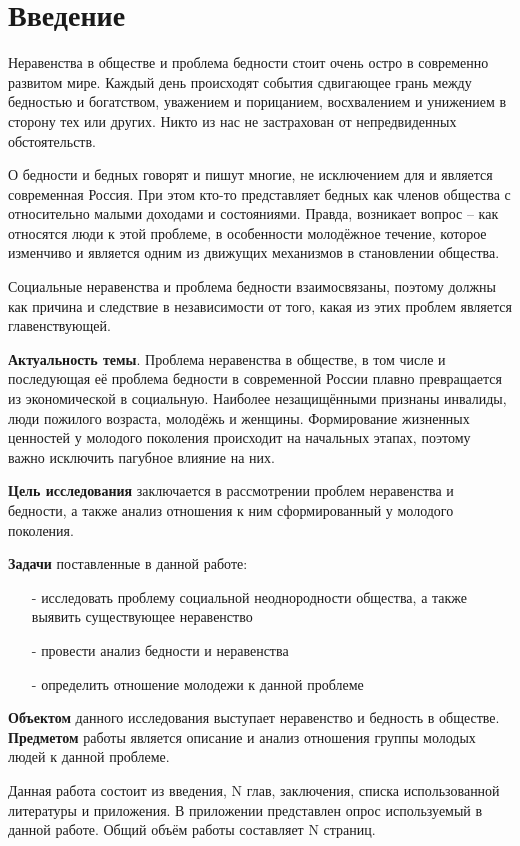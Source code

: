 \section*{Введение}

Неравенства в обществе и проблема бедности стоит очень остро в современно 
развитом мире. Каждый день происходят события сдвигающее грань между бедностью 
и богатством, уважением и порицанием, восхвалением и унижением в сторону тех 
или других. Никто из нас не застрахован от непредвиденных обстоятельств.

О бедности и бедных говорят и пишут многие, не исключением для и является 
современная Россия. При этом кто-то представляет бедных как членов общества с 
относительно малыми доходами и состояниями. Правда, возникает вопрос -- 
как относятся люди к этой проблеме, в особенности молодёжное течение, которое 
изменчиво и является одним из движущих механизмов в становлении общества.

Социальные неравенства и проблема бедности взаимосвязаны, поэтому должны как 
причина и следствие в независимости от того, какая из этих проблем является 
главенствующей.

\textbf{Актуальность темы}. Проблема неравенства в обществе, в том числе и 
последующая её проблема бедности в современной России плавно превращается из 
экономической в социальную. Наиболее незащищёнными признаны инвалиды, люди 
пожилого возраста, молодёжь и женщины. Формирование жизненных ценностей у 
молодого поколения происходит на начальных этапах, поэтому важно исключить 
пагубное влияние на них.

\textbf{Цель исследования} заключается в рассмотрении проблем неравенства и 
бедности, а также анализ отношения к ним сформированный у молодого поколения.  

\textbf{Задачи} поставленные в данной работе:
\begin{itemize}
    \item[-] исследовать проблему социальной неоднородности общества, а также 
        выявить существующее неравенство
    \item[-] провести анализ бедности и неравенства
    \item[-] определить отношение молодежи к данной проблеме
\end{itemize}

\textbf{Объектом} данного исследования выступает неравенство и бедность в 
обществе. \textbf{Предметом} работы является описание и анализ отношения 
группы молодых людей к данной проблеме.

Данная работа состоит из введения, N глав, заключения, списка использованной 
литературы и приложения. В приложении представлен опрос используемый в данной 
работе. Общий объём работы составляет N страниц.

\newpage